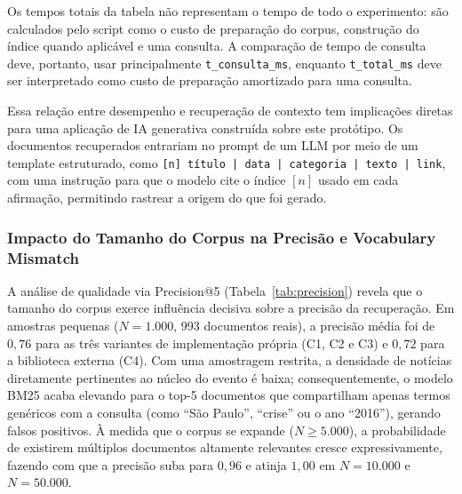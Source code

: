 \documentclass[12pt, a4paper]{article}
\begin{document}
Os tempos totais da tabela não representam o tempo de todo o experimento: são calculados pelo script como o custo de preparação do corpus, construção do índice quando aplicável e uma consulta. A comparação de tempo de consulta deve, portanto, usar principalmente \texttt{t\_consulta\_ms}, enquanto \texttt{t\_total\_ms} deve ser interpretado como custo de preparação amortizado para uma consulta.

Essa relação entre desempenho e recuperação de contexto tem implicações diretas para uma aplicação de IA generativa construída sobre este protótipo. Os documentos recuperados entrariam no prompt de um LLM por meio de um template estruturado, como \texttt{[n] título | data | categoria | texto | link}, com uma instrução para que o modelo cite o índice $[n]$ usado em cada afirmação, permitindo rastrear a origem do que foi gerado. 

\subsubsection{Impacto do Tamanho do Corpus na Precisão e Vocabulary Mismatch}

A análise de qualidade via Precision@5 (Tabela~\ref{tab:precision}) revela que o tamanho do corpus exerce influência decisiva sobre a precisão da recuperação. Em amostras pequenas ($N=1.000$, 993 documentos reais), a precisão média foi de $0{,}76$ para as três variantes de implementação própria (C1, C2 e C3) e $0{,}72$ para a biblioteca externa (C4). Com uma amostragem restrita, a densidade de notícias diretamente pertinentes ao núcleo do evento é baixa; consequentemente, o modelo BM25 acaba elevando para o top-5 documentos que compartilham apenas termos genéricos com a consulta (como ``São Paulo'', ``crise'' ou o ano ``2016''), gerando falsos positivos. À medida que o corpus se expande ($N \ge 5.000$), a probabilidade de existirem múltiplos documentos altamente relevantes cresce expressivamente, fazendo com que a precisão suba para $0{,}96$ e atinja $1{,}00$ em $N=10.000$ e $N=50.000$.
\end{document}
